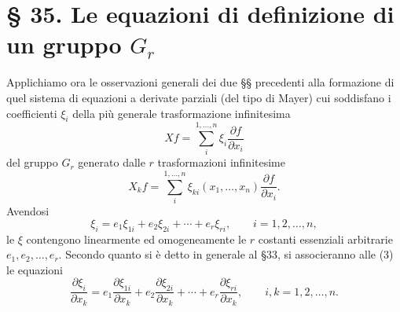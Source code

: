 \documentclass[11pt]{book}
\begin{document}
\section*{\S{} 35. Le equazioni di definizione di un gruppo $G_r$}

Applichiamo ora le osservazioni generali dei due \S\S{} precedenti alla formazione di quel sistema di equazioni a derivate parziali (del tipo di Mayer) cui soddisfano i coefficienti $\xi_i$ della più generale trasformazione infinitesima
\[
 Xf=\sum\limits_i^{1,\ldots,n}\xi_i\frac{\partial f}{\partial x_i}
\]
del gruppo $G_r$ generato dalle $r$ trasformazioni infinitesime
\[
 X_k f=\sum\limits_i^{1,\ldots,n}\xi_{ki}(x_1,\ldots,x_n)\frac{\partial f}{\partial x_i}.
\]
Avendosi
\begin{equation*}\tag{3}
 \xi_i=e_1\xi_{1i}+e_2\xi_{2i}+\cdots+e_r\xi_{ri},
 \qquad i=1,2,\ldots,n,
\end{equation*}
le $\xi$ contengono linearmente ed omogeneamente le $r$ costanti essenziali arbitrarie $e_1,e_2,\ldots,e_r$. Secondo quanto si è detto in generale al \S{}33, si associeranno alle (3) le equazioni
\begin{equation*}\tag{$3_1$}
 \frac{\partial\xi_i}{\partial x_k}
  =e_1\frac{\partial\xi_{1i}}{\partial x_k}
  +e_2\frac{\partial\xi_{2i}}{\partial x_k}
  +\cdots
  +e_r\frac{\partial\xi_{ri}}{\partial x_k},
 \qquad i,k=1,2,\ldots,n.
\end{equation*}
\end{document}
